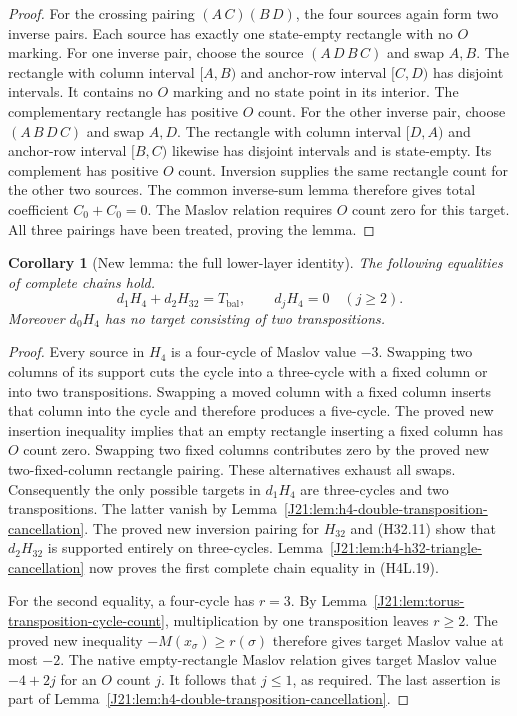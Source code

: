 \documentclass[11pt,oneside]{report}
\newtheorem{corollary}[theorem]{Corollary}
\theoremstyle{definition}
\numberwithin{equation}{section}
\begin{document}
\begin{proof}
For the crossing pairing $(A\,C)(B\,D)$, the four sources again
form two inverse pairs. Each source has exactly one state-empty
rectangle with no $O$ marking.
For one inverse pair, choose the source $(A\,D\,B\,C)$ and
swap $A,B$.
The rectangle with column interval $[A,B)$ and anchor-row interval
$[C,D)$ has disjoint intervals. It contains no $O$ marking and no
state point in its interior.
The complementary rectangle has positive $O$ count.
For the other inverse pair, choose $(A\,B\,D\,C)$ and swap
$A,D$.
The rectangle with column interval $[D,A)$ and anchor-row interval
$[B,C)$ likewise has disjoint intervals and is state-empty.
Its complement has positive $O$ count.
Inversion supplies the same rectangle count for the other two
sources.
The common inverse-sum lemma therefore gives total coefficient
$C_0+C_0=0$.
The Maslov relation requires $O$ count zero for this target.
All three pairings have been treated, proving the lemma.
\end{proof}

\begin{corollary}[New lemma: the full lower-layer identity]
\label{J21:cor:h4-h32-lower-identity}
The following equalities of complete chains hold.
\[
                    d_1H_4+d_2H_{32}=T_{\mathrm{bal}},
             \qquad d_jH_4=0\quad(j\geq2).
 \tag{H4L.19}
\]
Moreover $d_0H_4$ has no target consisting of two transpositions.
\end{corollary}
\begin{proof}
Every source in $H_4$ is a four-cycle of Maslov value $-3$.
Swapping two columns of its support cuts the cycle into a three-cycle
with a fixed column or into two transpositions.
Swapping a moved column with a fixed column inserts that column into
the cycle and therefore produces a five-cycle.
The proved new insertion inequality implies that an empty rectangle
inserting a fixed column has $O$ count zero.
Swapping two fixed columns contributes zero by the proved new
two-fixed-column rectangle pairing.
These alternatives exhaust all swaps.
Consequently the only possible targets in $d_1H_4$ are three-cycles
and two transpositions.
The latter vanish by
Lemma~\ref{J21:lem:h4-double-transposition-cancellation}.
The proved new inversion pairing for $H_{32}$ and (H32.11) show
that $d_2H_{32}$ is supported entirely on three-cycles.
Lemma~\ref{J21:lem:h4-h32-triangle-cancellation} now proves the first
complete chain equality in (H4L.19).

For the second equality, a four-cycle has $r=3$.
By Lemma~\ref{J21:lem:torus-transposition-cycle-count}, multiplication by
one transposition leaves $r\geq2$. The proved new inequality
$-M(x_\sigma)\geq r(\sigma)$ therefore gives target Maslov value
at most $-2$.
The native empty-rectangle Maslov relation gives target Maslov value
$-4+2j$ for an $O$ count $j$.
It follows that $j\leq1$, as required.
The last assertion is part of
Lemma~\ref{J21:lem:h4-double-transposition-cancellation}.
\end{proof}
\end{document}
